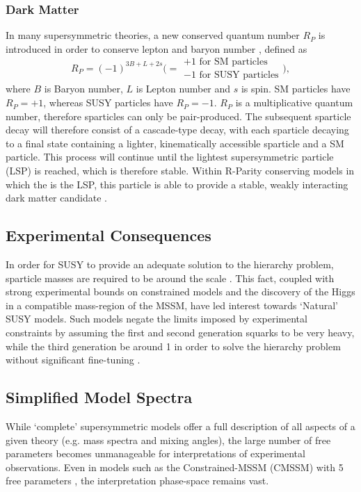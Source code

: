 \subsubsection{Dark Matter}
In many supersymmetric theories, a new conserved quantum number $R_P$
is introduced in order to conserve lepton and baryon number
\cite{Farrar1978575}, defined as
% 
\begin{equation}
R_P = (-1)^{3B+L+2s} \Bigg( =
\begin{array}{l} 
+1 \text{ for SM particles}\\ -1 \text{ for SUSY particles}
\end{array}\Bigg) ,
\end{equation}
% 
where $B$ is Baryon number, $L$ is Lepton number and $s$ is spin. SM particles
have $R_P = +1$, whereas SUSY particles have $R_P = -1$. $R_P$ is a
multiplicative quantum number, therefore sparticles
can only be pair-produced. The subsequent sparticle decay will therefore consist
of a cascade-type decay, with each sparticle decaying to a final state
containing a lighter, kinematically accessible sparticle and a SM particle.
This process will continue until the lightest supersymmetric particle (LSP) is
reached, which is therefore stable. Within R-Parity conserving models in which
the \chiz is the LSP, this particle is able to provide a stable, weakly
interacting dark matter candidate \cite{Jungman:1995df}.


\subsection{Experimental Consequences}
In order for SUSY to provide an adequate solution to the hierarchy problem,
sparticle masses are required to be around the \tev scale
\cite{ref:barbierinsusy,ref:hierarchy1,ref:hierarchy2}. This fact, coupled
with strong experimental bounds on constrained models and the discovery of
the Higgs in a compatible mass-region of the MSSM, have led interest
towards `Natural' SUSY models. Such models negate the limits imposed by
experimental constraints by assuming the first and second generation squarks to
be very heavy, while the third generation be around 1 \tev in order to solve
the hierarchy problem without significant fine-tuning
\cite{Carena:2008rt, Papucci:2011wy}.

\subsection{Simplified Model Spectra}
While `complete' supersymmetric models offer a full description of all
aspects of a given theory (e.g. mass spectra and mixing angles), the large
number of free parameters becomes unmanageable for interpretations
of experimental observations. Even in models such as the
Constrained-MSSM (CMSSM) with 5 free parameters
\cite{Kane:1993td, Ellis:2002rp}, the interpretation phase-space remains vast.


